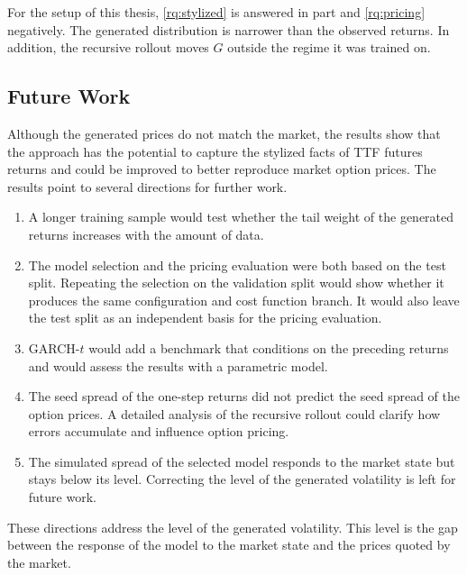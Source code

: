 For the setup of this thesis, \ref{rq:stylized} is answered in part and \ref{rq:pricing} negatively. The generated distribution is narrower than the observed returns. In addition, the recursive rollout moves $G$ outside the regime it was trained on.

\clearpage
\subsection{Future Work}\label{sec:future-work}

Although the generated prices do not match the market, the results show that the approach has the potential to capture the stylized facts of TTF futures returns and could be improved to better reproduce market option prices. The results point to several directions for further work.

\begin{enumerate}
    \item A longer training sample would test whether the tail weight of the generated returns increases with the amount of data. 
    \item The model selection and the pricing evaluation were both based on the test split. Repeating the selection on the validation split would show whether it produces the same configuration and cost function branch. It would also leave the test split as an independent basis for the pricing evaluation.
    \item GARCH-$t$ would add a benchmark that conditions on the preceding returns and would assess the results with a parametric model. 
    \item The seed spread of the one-step returns did not predict the seed spread of the option prices. A detailed analysis of the recursive rollout could clarify how errors accumulate and influence option pricing.
    \item The simulated spread of the selected model responds to the market state but stays below its level. Correcting the level of the generated volatility is left for future work. 
\end{enumerate}
These directions address the level of the generated volatility. This level is the gap between the response of the model to the market state and the prices quoted by the market.